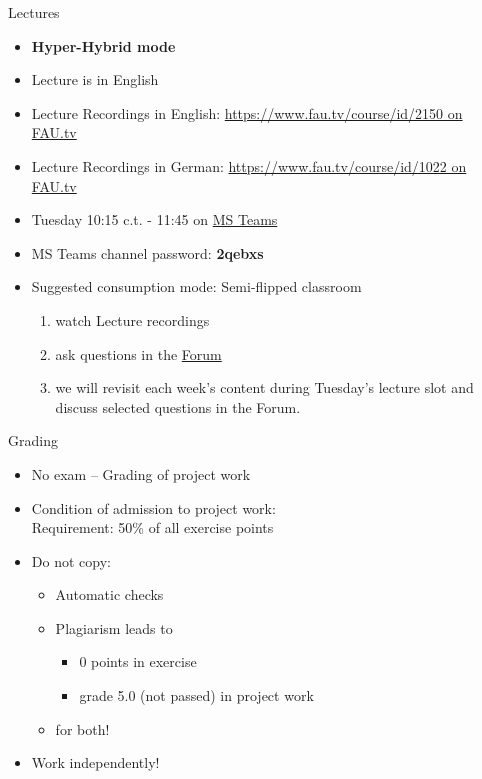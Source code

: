 \begin{frame}[c]{Lectures}
	\begin{itemize}
		\setlength\itemsep{0.4cm}
		\item \textbf{Hyper-Hybrid mode}
		\item Lecture is in English
		\item Lecture Recordings in English: \href{https://www.fau.tv/course/id/2150}{https://www.fau.tv/course/id/2150 on FAU.tv}
		\item Lecture Recordings in German: \href{https://www.fau.tv/course/id/1022}{https://www.fau.tv/course/id/1022 on FAU.tv}
		\item Tuesday 10:15 c.t. - 11:45 on \href{https://teams.microsoft.com/l/team/19\%3adRCxup9jUsjM31xr9T4jdAFDB-ImEk_lU5Fy05ijYx81\%40thread.tacv2/conversations?groupId=6b2df36b-cec0-46b3-83d2-b4e6d1c6ac30\&tenantId=b2efcef3-8496-40b8-9de8-f135982f3461}{MS Teams}
		\item MS Teams channel password: \textbf{2qebxs}
		\item Suggested consumption mode: Semi-flipped classroom 
		\begin{enumerate}
			\item watch Lecture recordings
			\item ask questions in the \href{https://www.studon.fau.de/studon/goto.php?target=frm_4286923}{Forum}
			\item we will revisit each week's content during Tuesday's lecture slot and discuss selected questions in the Forum.   
		\end{enumerate}
	\end{itemize}
\end{frame}

\begin{frame}[c]{Grading}
	\begin{itemize}
		\setlength\itemsep{0.4cm}
		\item No exam -- Grading of project work
		\item Condition of admission to project work:\\
		      Requirement: 50\% of all exercise points
		\item Do not copy:
		      \begin{itemize}
			      \item Automatic checks
			      \item Plagiarism leads to
			            \begin{itemize}
				            \item 0 points in exercise
				            \item grade 5.0 (not passed) in project work
			            \end{itemize}
			      \item for both!
		      \end{itemize}
		\item Work independently!
	\end{itemize}
\end{frame}

